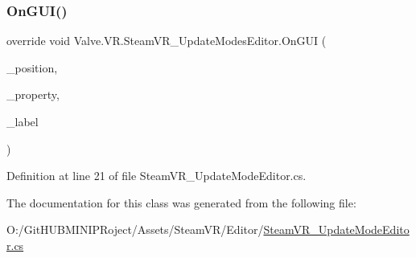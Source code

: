 \subsubsection{\texorpdfstring{OnGUI()}{OnGUI()}}
{\footnotesize\ttfamily override void Valve.\+V\+R.\+Steam\+V\+R\+\_\+\+Update\+Modes\+Editor.\+On\+G\+UI (\begin{DoxyParamCaption}\item[{Rect}]{\+\_\+position,  }\item[{Serialized\+Property}]{\+\_\+property,  }\item[{G\+U\+I\+Content}]{\+\_\+label }\end{DoxyParamCaption})}



Definition at line 21 of file Steam\+V\+R\+\_\+\+Update\+Mode\+Editor.\+cs.



The documentation for this class was generated from the following file\+:\begin{DoxyCompactItemize}
\item 
O\+:/\+Git\+H\+U\+B\+M\+I\+N\+I\+P\+Roject/\+Assets/\+Steam\+V\+R/\+Editor/\mbox{\hyperlink{_steam_v_r___update_mode_editor_8cs}{Steam\+V\+R\+\_\+\+Update\+Mode\+Editor.\+cs}}\end{DoxyCompactItemize}
